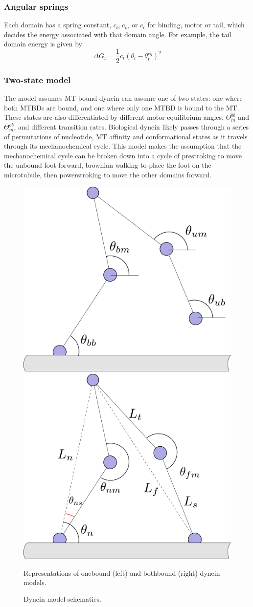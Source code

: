 \documentclass[10pt]{article} %
\begin{document}
\subsubsection{Angular springs}
Each domain has a spring constant, $c_b, c_m$ or $c_t$ for binding, motor or tail, which decides the energy associated with that domain angle. For example, the tail domain energy is given by
%
\begin{equation}
  \Delta G_t = \frac12c_t\left(\theta_t - \theta_t^{eq}\right)^2
\end{equation}

\subsubsection{Two-state model}
The model assumes MT-bound dynein can assume one of two states: one where both MTBDs are bound, and one where only one MTBD is bound to the MT. These states are also differentiated by different motor equilibrium angles, $\Theta_{m}^{bb}$ and $\Theta_{m}^{ob}$, and different transition rates. Biological dynein likely passes through a series of permutations of nucleotide, MT affinity and conformational states as it travels through its mechanochemical cycle. This model makes the assumption that the mechanochemical cycle can be broken down into a cycle of prestroking to move the unbound foot forward, brownian walking to place the foot on the microtubule, then powerstroking to move the other domains forward.\\

\begin{figure}[h]
  \centering
  \includegraphics[width=.45\textwidth]{../../figures/code-onebound}
  \includegraphics[width=.45\textwidth]{../../figures/code-bothbound}
  \caption{Dynein model schematics.}{Representations of onebound (left) and bothbound (right) dynein models.}
  \label{ob_fig}
\end{figure}
\end{document}
